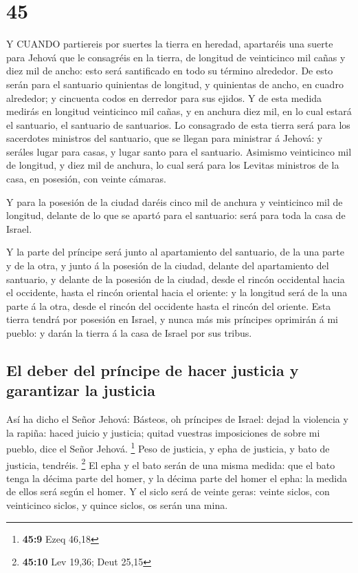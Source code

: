 \hypertarget{section-44}{%
\section{45}\label{section-44}}

 Y CUANDO partiereis por suertes la tierra en heredad,
apartaréis una suerte para Jehová que le consagréis en la tierra, de
longitud de veinticinco mil cañas y diez mil de ancho: esto será
santificado en todo su término alrededor.  De esto serán
para el santuario quinientas de longitud, y quinientas de ancho, en
cuadro alrededor; y cincuenta codos en derredor para sus ejidos.
 Y de esta medida medirás en longitud veinticinco mil cañas,
y en anchura diez mil, en lo cual estará el santuario, el santuario de
santuarios.  Lo consagrado de esta tierra será para los
sacerdotes ministros del santuario, que se llegan para ministrar á
Jehová: y seráles lugar para casas, y lugar santo para el santuario.
 Asimismo veinticinco mil de longitud, y diez mil de
anchura, lo cual será para los Levitas ministros de la casa, en
posesión, con veinte cámaras.

 Y para la posesión de la ciudad daréis cinco mil de anchura
y veinticinco mil de longitud, delante de lo que se apartó para el
santuario: será para toda la casa de Israel.

 Y la parte del príncipe será junto al apartamiento del
santuario, de la una parte y de la otra, y junto á la posesión de la
ciudad, delante del apartamiento del santuario, y delante de la posesión
de la ciudad, desde el rincón occidental hacia el occidente, hasta el
rincón oriental hacia el oriente: y la longitud será de la una parte á
la otra, desde el rincón del occidente hasta el rincón del oriente.
 Esta tierra tendrá por posesión en Israel, y nunca más mis
príncipes oprimirán á mi pueblo: y darán la tierra á la casa de Israel
por sus tribus.

\hypertarget{el-deber-del-pruxedncipe-de-hacer-justicia-y-garantizar-la-justicia}{%
\subsection{El deber del príncipe de hacer justicia y garantizar la
justicia}\label{el-deber-del-pruxedncipe-de-hacer-justicia-y-garantizar-la-justicia}}

 Así ha dicho el Señor Jehová: Básteos, oh príncipes de
Israel: dejad la violencia y la rapiña: haced juicio y justicia; quitad
vuestras imposiciones de sobre mi pueblo, dice el Señor Jehová.
\footnote{\textbf{45:9} Ezeq 46,18}  Peso de justicia, y
epha de justicia, y bato de justicia, tendréis. \footnote{\textbf{45:10}
  Lev 19,36; Deut 25,15}  El epha y el bato serán de una
misma medida: que el bato tenga la décima parte del homer, y la décima
parte del homer el epha: la medida de ellos será según el homer.
 Y el siclo será de veinte geras: veinte siclos, con
veinticinco siclos, y quince siclos, os serán una mina.

